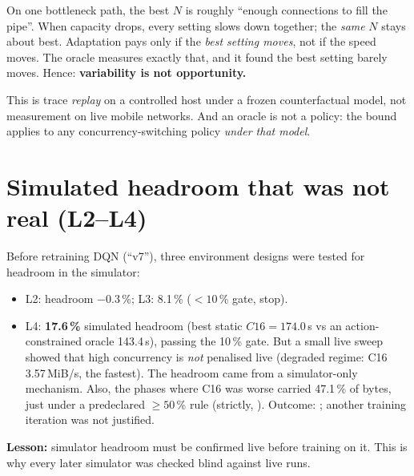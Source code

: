 \begin{doubt}
On one bottleneck path, the best $N$ is roughly ``enough connections to fill the pipe''. When capacity drops, every setting slows down together; the \emph{same} $N$ stays about best. Adaptation pays only if the \emph{best setting moves}, not if the speed moves. The oracle measures exactly that, and it found the best setting barely moves. Hence: \textbf{variability is not opportunity.}
\end{doubt}

\begin{careful}
This is trace \emph{replay} on a controlled host under a frozen counterfactual model, not measurement on live mobile networks. And an oracle is not a policy: the bound applies to any concurrency-switching policy \emph{under that model}.
\end{careful}

\section{Simulated headroom that was not real (L2--L4)}
Before retraining DQN (``v7''), three environment designs were tested for headroom in the simulator:
\begin{itemize}
\item L2: headroom $-0.3$\,\%; L3: 8.1\,\% ($<10$\,\% gate, stop).
\item L4: \textbf{17.6\,\%} simulated headroom (best static $C16 = 174.0$\,s vs an action-constrained oracle 143.4\,s), passing the 10\,\% gate. But a small live sweep showed that high concurrency is \emph{not} penalised live (degraded regime: C16 3.57\,MiB/s, the fastest). The headroom came from a simulator-only mechanism. Also, the phases where C16 was worse carried 47.1\,\% of bytes, just under a predeclared $\ge50$\,\% rule (strictly, ). Outcome: ; another training iteration was not justified.
\end{itemize}
\textbf{Lesson:} simulator headroom must be confirmed live before training on it. This is why every later simulator was checked blind against live runs.
